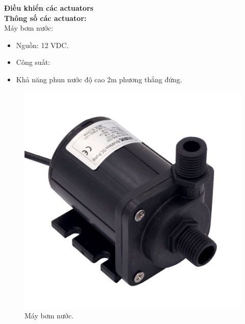 \documentclass[a4paper,12pt,oneside]{article}
\begin{document}
\noindent \textbf{Điều khiển các actuators}\\
\noindent \textbf{Thông số các actuator:}\\
Máy bơm nước:
\begin{itemize}
\item Nguồn: 12 VDC.
\item Công suất:
\item Khả năng phun nước độ cao 2m phương thẳng đứng.
\end{itemize}
\begin{figure}[h!]
\begin{center}
\includegraphics[scale=0.1]{hinh/pump.jpg}
\end{center}
\caption{Máy bơm nước.}
\end{figure}
\end{document}
